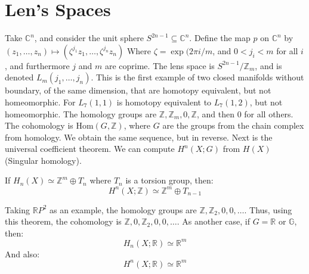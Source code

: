 \documentclass{book}                                                           %
\begin{document}
        \section{Len's Spaces}
            Take $\mathbb{C}^{n}$, and consider the unit
            sphere $S^{2n-1}\subseteq\mathbb{C}^{n}$. Define
            the map $p$ on $\mathbb{C}^{n}$ by
            $(z_{1},\dots,z_{n})\mapsto%
             (\zeta^{j_{1}}z_{1},\dots,\zeta^{j_{n}}z_{n})$
            Where $\zeta=\exp(2\pi{i}/m$, and
            $0<j_{i}<m$ for all $i$, and furthermore
            $j$ and $m$ are coprime. The lens space is
            $S^{2n-1}/\mathbb{Z}_{m}$, and is denoted
            $L_{m}(j_{1},\dots,j_{n})$. This is the first
            example of two closed manifolds without
            boundary, of the same dimension, that are
            homotopy equivalent, but not homeomorphic.
            For $L_{7}(1,1)$ is homotopy equivalent to
            $L_{7}(1,2)$, but not homeomorphic. The
            homology groups are
            $\mathbb{Z},\mathbb{Z}_{m},0,\mathbb{Z}$, and
            then $0$ for all others. The cohomology is
            $\mathrm{Hom}(G,\mathbb{Z})$, where $G$ are
            the groups from the chain complex from homology.
            We obtain the same sequence, but in reverse.
            Next is the universal coefficient theorem. We
            can compute $H^{n}(X;G)$ from
            $H(X)$ (Singular homology).
            \begin{theorem}
                If $H_{n}(X)\simeq\mathbb{Z}^{m}\oplus{T}_{n}$
                where $T_{n}$ is a torsion group, then:
                \begin{equation}
                    H^{n}(X;\mathbb{Z})\simeq
                    \mathbb{Z}^{m}\oplus{T}_{n-1}
                \end{equation}
            \end{theorem}
            Taking $\mathbb{R}P^{2}$ as an example, the
            homology groups are
            $\mathbb{Z},\mathbb{Z}_{2},0,0,\dots$. Thus, using
            this theorem, the cohomology is
            $\mathbb{Z},0,\mathbb{Z}_{2},0,0,\dots$. As
            another case, if $G=\mathbb{R}$ or $\mathbb{G}$,
            then:
            \begin{equation}
                H_{n}(X;\mathbb{R})\simeq\mathbb{R}^{m}
            \end{equation}
            And also:
            \begin{equation}
                H^{n}(X;\mathbb{R})\simeq\mathbb{R}^{m}
            \end{equation}
\end{document}
